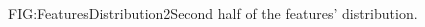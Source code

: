\begin{figure}[Second half of the features' distribution]{FIG:FeaturesDistribution2}{Second half of the features' distribution.}
    \begin{adjustbox}{width=1\textwidth,height=\textheight,keepaspectratio}
    \end{adjustbox}
\end{figure}